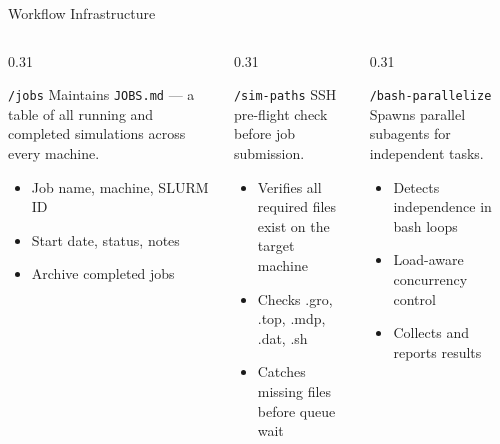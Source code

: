 \documentclass[aspectratio=169, 10pt]{beamer}
\begin{document}
\begin{frame}{Workflow Infrastructure}
  \begin{columns}[T]
    \begin{column}{0.31\textwidth}
      \begin{block}{\texttt{/jobs}}
        \small
        Maintains \texttt{JOBS.md} --- a table of all running and completed simulations across every machine.
        \begin{itemize}[label=\textbullet]\setlength\itemsep{2pt}
          \item Job name, machine, SLURM ID
          \item Start date, status, notes
          \item Archive completed jobs
        \end{itemize}
      \end{block}
    \end{column}
    \begin{column}{0.31\textwidth}
      \begin{block}{\texttt{/sim-paths}}
        \small
        SSH pre-flight check before job submission.
        \begin{itemize}[label=\textbullet]\setlength\itemsep{2pt}
          \item Verifies all required files exist on the target machine
          \item Checks .gro, .top, .mdp, .dat, .sh
          \item Catches missing files before queue wait
        \end{itemize}
      \end{block}
    \end{column}
    \begin{column}{0.31\textwidth}
      \begin{block}{\texttt{/bash-parallelize}}
        \small
        Spawns parallel subagents for independent tasks.
        \begin{itemize}[label=\textbullet]\setlength\itemsep{2pt}
          \item Detects independence in bash loops
          \item Load-aware concurrency control
          \item Collects and reports results
        \end{itemize}
      \end{block}
    \end{column}
  \end{columns}

\end{frame}
\end{document}
